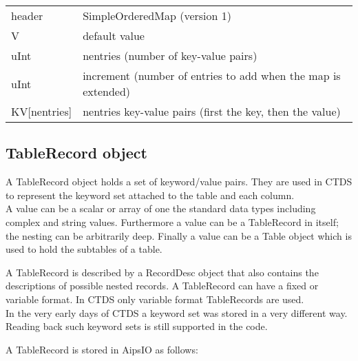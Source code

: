 \vspace{0.15in}
\begin{tabular}{|l|p{13cm}|} \hline
  header & SimpleOrderedMap (version 1) \\
  V & default value \\
  uInt & nentries (number of key-value pairs) \\
  uInt & increment (number of entries to add when the map is extended) \\
  KV[nentries] & nentries key-value pairs (first the key, then the value) \\
  \hline
\end{tabular}
\vspace{0.15in}

 
\subsection{\label{CTDS:TABLERECORD}TableRecord object}
A TableRecord object holds a set of keyword/value pairs. They are used
in CTDS to represent the keyword set attached to the table and each column.
\\A value can be a scalar or array of one the standard data types including
complex and string values. Furthermore a value can be a TableRecord in
itself; the nesting can be arbitrarily deep. Finally a value can be
a Table object which is used to hold the subtables of a table.

A TableRecord is described by a RecordDesc object that also
contains the descriptions of possible nested records. A TableRecord
can have a fixed or variable format. In CTDS only variable format
TableRecords are used.
\\In the very early days of CTDS a keyword set was stored in a very
different way. Reading back such keyword sets is still supported in
the code.

A TableRecord is stored in AipsIO as follows:

